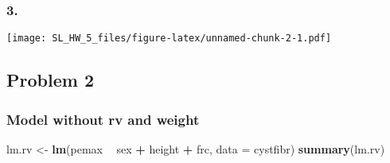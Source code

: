 \documentclass[]{article}
\newenvironment{Shaded}{\begin{snugshade}}{\end{snugshade}}
\newcommand{\ControlFlowTok}[1]{\textcolor[rgb]{0.13,0.29,0.53}{\textbf{#1}}}
\newcommand{\DataTypeTok}[1]{\textcolor[rgb]{0.13,0.29,0.53}{#1}}
\newcommand{\DecValTok}[1]{\textcolor[rgb]{0.00,0.00,0.81}{#1}}
\newcommand{\FloatTok}[1]{\textcolor[rgb]{0.00,0.00,0.81}{#1}}
\newcommand{\KeywordTok}[1]{\textcolor[rgb]{0.13,0.29,0.53}{\textbf{#1}}}
\newcommand{\NormalTok}[1]{#1}
\newcommand{\OperatorTok}[1]{\textcolor[rgb]{0.81,0.36,0.00}{\textbf{#1}}}
\newcommand{\StringTok}[1]{\textcolor[rgb]{0.31,0.60,0.02}{#1}}
\begin{document}
\hypertarget{section-2}{%
\subsubsection{3.}\label{section-2}}

\begin{Shaded}
\end{Shaded}

\texttt{[image: SL\_HW\_5\_files/figure-latex/unnamed-chunk-2-1.pdf]}

\hypertarget{problem-2}{%
\subsection{Problem 2}\label{problem-2}}

\hypertarget{model-without-rv-and-weight}{%
\subsubsection{Model without rv and
weight}\label{model-without-rv-and-weight}}

\begin{Shaded}
\begin{Highlighting}[]
\NormalTok{lm.rv <-}\StringTok{ }\KeywordTok{lm}\NormalTok{(pemax }\OperatorTok{~}\StringTok{ }\NormalTok{sex }\OperatorTok{+}\StringTok{ }\NormalTok{height }\OperatorTok{+}\StringTok{ }\NormalTok{frc, }\DataTypeTok{data =}\NormalTok{ cystfibr)}
\KeywordTok{summary}\NormalTok{(lm.rv)}
\end{Highlighting}
\end{Shaded}
\end{document}
